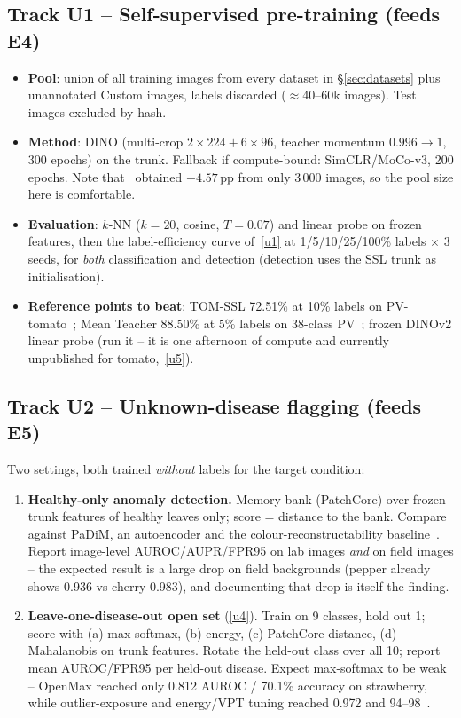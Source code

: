 \subsection{Track U1 -- Self-supervised pre-training (feeds E4)}
\begin{itemize}
  \item \textbf{Pool}: union of all training images from every dataset in \S\ref{sec:datasets} plus unannotated Custom images, labels discarded ($\approx$40--60k images). Test images excluded by hash.
  \item \textbf{Method}: DINO (multi-crop $2\times224 + 6\times96$, teacher momentum $0.996\to1$, 300 epochs) on the \model{} trunk. Fallback if compute-bound: SimCLR/MoCo-v3, 200 epochs. Note that~\cite{sonavane2026} obtained $+4.57$\,pp from only 3\,000 images, so the pool size here is comfortable.
  \item \textbf{Evaluation}: $k$-NN ($k{=}20$, cosine, $T{=}0.07$) and linear probe on frozen features, then the label-efficiency curve of~\ref{u1} at 1/5/10/25/100\% labels $\times$ 3 seeds, for \emph{both} classification and detection (detection uses the SSL trunk as initialisation).
  \item \textbf{Reference points to beat}: TOM-SSL 72.51\% at 10\% labels on PV-tomato~\cite{tomssl2025}; Mean Teacher 88.50\% at 5\% labels on 38-class PV~\cite{ilsever2024}; frozen DINOv2 linear probe (run it -- it is one afternoon of compute and currently unpublished for tomato,~\ref{u5}).
\end{itemize}

\subsection{Track U2 -- Unknown-disease flagging (feeds E5)}
Two settings, both trained \emph{without} labels for the target condition:
\begin{enumerate}
  \item \textbf{Healthy-only anomaly detection.} Memory-bank (PatchCore) over frozen \model{} trunk features of healthy leaves only; score = distance to the bank. Compare against PaDiM, an autoencoder and the colour-reconstructability baseline~\cite{katafuchi2021}. Report image-level AUROC/AUPR/FPR95 on lab images \emph{and} on field images -- the expected result is a large drop on field backgrounds (pepper already shows 0.936 vs cherry 0.983), and documenting that drop is itself the finding.
  \item \textbf{Leave-one-disease-out open set} (\ref{u4}). Train on 9 classes, hold out 1; score with (a) max-softmax, (b) energy, (c) PatchCore distance, (d) Mahalanobis on trunk features. Rotate the held-out class over all 10; report mean AUROC/FPR95 per held-out disease. Expect max-softmax to be weak -- OpenMax reached only 0.812 AUROC / 70.1\% accuracy on strawberry, while outlier-exposure and energy/VPT tuning reached 0.972 and 94--98~\cite{openmatch2022,dong2024}.
\end{enumerate}

